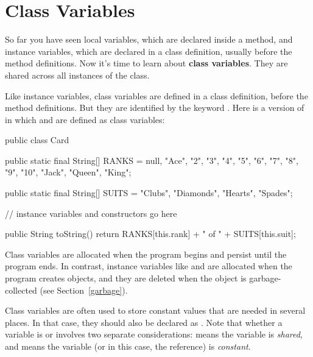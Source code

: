 \section{Class Variables}
\label{classvar}


So far you have seen local variables, which are declared inside a method, and instance variables, which are declared in a class definition, usually before the method definitions.
Now it's time to learn about {\bf class variables}.
They are shared across all instances of the class.



Like instance variables, class variables are defined in a class definition, before the method definitions.
But they are identified by the keyword .
Here is a version of  in which  and  are defined as class variables:

\begin{code}
public class Card {

    public static final String[] RANKS = {
        null, "Ace", "2", "3", "4", "5", "6", "7",
        "8", "9", "10", "Jack", "Queen", "King"};

    public static final String[] SUITS = {
        "Clubs", "Diamonds", "Hearts", "Spades"};

    // instance variables and constructors go here

    public String toString() {
        return RANKS[this.rank] + " of " + SUITS[this.suit];
    }
}
\end{code}


Class variables are allocated when the program begins and persist until the program ends.
In contrast, instance variables like  and  are allocated when the program creates  objects, and they are deleted when the object is garbage-collected (see Section~\ref{garbage}).


Class variables are often used to store constant values that are needed in several places.
In that case, they should also be declared as .
Note that whether a variable is  or  involves two separate considerations:
 means the variable is {\em shared}, and  means the variable (or in this case, the reference) is {\em constant}.

